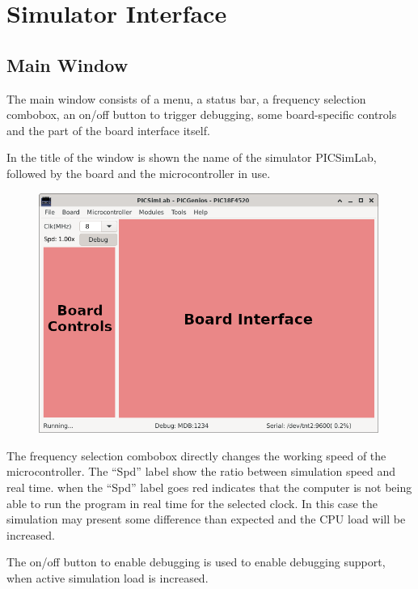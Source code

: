 
\chapter{Simulator Interface}

\section{Main Window}

The main window consists of a menu, a status bar, a frequency selection combobox, an on/off button to trigger debugging, some board-specific controls and the part of the board interface itself.

In the title of the window is shown the name of the simulator PICSimLab, followed by the board and the microcontroller in use.


\begin{figure}[H]
\center
\includegraphics[width=0.99\textwidth]{img/int.png} 
\end{figure} 

The frequency selection combobox directly changes the working speed of the microcontroller.
The ``Spd'' label show the ratio between simulation speed and real time. when the ``Spd'' label goes red indicates that the computer is not being able to run the program in real time for the selected clock. 
In this case the simulation may present some difference than expected and the CPU load will be increased.

The on/off button to enable debugging is used to enable debugging support, when active simulation load is increased.

